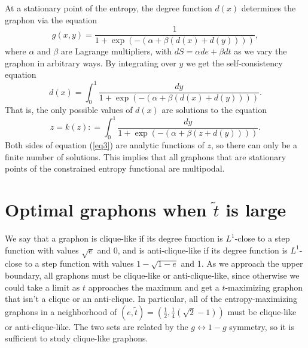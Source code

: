 \documentclass[12pt]{amsart}
\newcommand{\1}{\mathbf{1}}
\begin{document}
At a stationary point of the entropy, the degree 
function $d(x)$ determines the graphon via the equation 
\begin{equation}\label{eq1} 
g(x,y) = \frac{1}{1 + \exp(-(\alpha+\beta (d(x)+d(y))))},
\end{equation} 
where $\alpha$ and $\beta$ are Lagrange multipliers, with $dS = \alpha de + \beta dt$ as we vary the graphon in arbitrary ways.
By integrating over $y$ we get the self-consistency equation 
\begin{equation}\label{eq2} 
d(x) = \int_0^1 \frac{dy} {1 + \exp(-(\alpha+\beta (d(x)+d(y))))}. 
\end{equation}
That is, the only possible values of $d(x)$ are solutions to the equation 
\begin{equation}\label{eq3} 
z = k(z) : = \int_0^1 \frac{dy} {1 + \exp(-(\alpha+\beta (z+d(y))))}. 
\end{equation}
Both sides of equation (\ref{eq3}) are analytic functions of $z$, so there can only be a finite number of solutions. This implies that all graphons that are 
stationary points of the constrained entropy functional are multipodal. 

\section{Optimal graphons when $\tilde t$ is large}\label{sec:large}

We say that a graphon is clique-like if its degree function is $L^1$-close to a step function with values $\sqrt{e}$ and 0, 
and is anti-clique-like if its degree function is $L^1$-close to a step function with values $1-\sqrt{1-e}$ and 1. As we approach
the upper boundary, all graphons must be clique-like or anti-clique-like, since otherwise we could take a limit as $t$ approaches
the maximum and get a $t$-maximizing graphon that isn't a clique or an anti-clique. 
In particular, all of the entropy-maximizing
graphons in a neighborhood of $(e, \tilde t) = \left (\frac12, \frac14(\sqrt{2}-1)\right )$ must be clique-like or anti-clique-like. 
The two sets are related by the $g \leftrightarrow 1-g$ symmetry, so it is 
sufficient to study clique-like graphons. 
\end{document}
